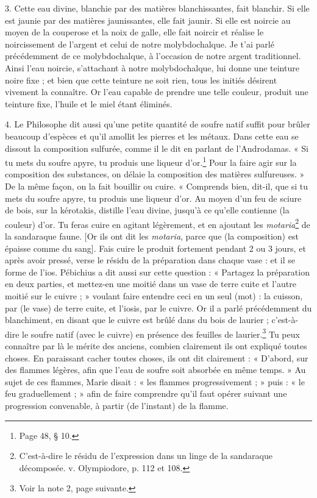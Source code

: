 \documentclass[landscape, a4paper, 11pt, oneside, polutonikogreek, french]{article}
\begin{document}
3. Cette eau divine, blanchie par des matières blanchissantes, fait blanchir. Si elle est jaunie par des matières jaunissantes, elle fait jaunir. Si elle est noircie au moyen de la couperose et la noix de galle, elle fait noircir et réalise le noircissement de l'argent et celui de notre molybdochalque. Je t'ai parlé précédemment de ce molybdochalque, à l'occasion de notre argent traditionnel. Ainsi l'eau noircie, s'attachant à notre molybdochalque, lui donne une teinture noire fixe ; et bien que cette teinture ne soit rien, tous les initiés désirent vivement la connaître. Or l'eau capable de prendre une telle couleur, produit une teinture fixe, l'huile et le miel étant éliminés.

4. Le Philosophe dit aussi qu'une petite quantité de soufre natif suffit pour brûler beaucoup d'espèces et qu'il amollit les pierres et les métaux. Dans cette eau se dissout la composition sulfurée, comme il le dit en parlant de l'Androdamas. « Si tu mets du soufre apyre, tu produis une liqueur d'or.\footnote{Page 48, § 10.} Pour la faire agir sur la composition des substances, on délaie la composition des matières sulfureuses. » De la même façon, on la fait bouillir ou cuire. « Comprends bien, dit-il, que si tu mets du soufre apyre, tu produis une liqueur d'or. Au moyen d'un feu de sciure de bois, sur la kérotakis, distille l'eau divine, jusqu'à ce qu'elle contienne (la couleur) d'or. Tu feras cuire en agitant légèrement, et en ajoutant les \emph{motaria}\footnote{C'est-à-dire le résidu de l'expression dans un linge de la sandaraque décomposée. v. Olympiodore, p. 112 et 108.} de la sandaraque faune. [Or ils ont dit les \emph{motaria}, parce que (la composition) est épaisse comme du sang]. Fais cuire le produit fortement pendant 2 ou 3 jours, et après avoir pressé, verse le résidu de la préparation dans chaque vase : et il se forme de l'ios. Pébichius a dit aussi sur cette question : « Partagez la préparation en deux parties, et mettez-en une moitié dans un vase de terre cuite et l'autre moitié sur le cuivre ; » voulant faire entendre ceci en un seul (mot) : la cuisson, par (le vase) de terre cuite, et l'iosis, par le cuivre. Or il a parlé précédemment du blanchiment, en disant que le cuivre est brûlé dans du bois de laurier ; c'est-à-dire le soufre natif (avec le cuivre) en présence des feuilles de laurier.\footnote{Voir la note 2, page suivante.} Tu peux connaître par là le mérite des anciens, combien clairement ils ont expliqué toutes choses. En paraissant cacher toutes choses, ils ont dit clairement : « D'abord, sur des flammes légères, afin que l'eau de soufre soit absorbée en même temps. » Au sujet de ces flammes, Marie disait : « les flammes progressivement ; » puis : « le feu graduellement ; » afin de faire comprendre qu'il faut opérer suivant une progression convenable, à partir (de l'instant) de la flamme.
\end{document}
